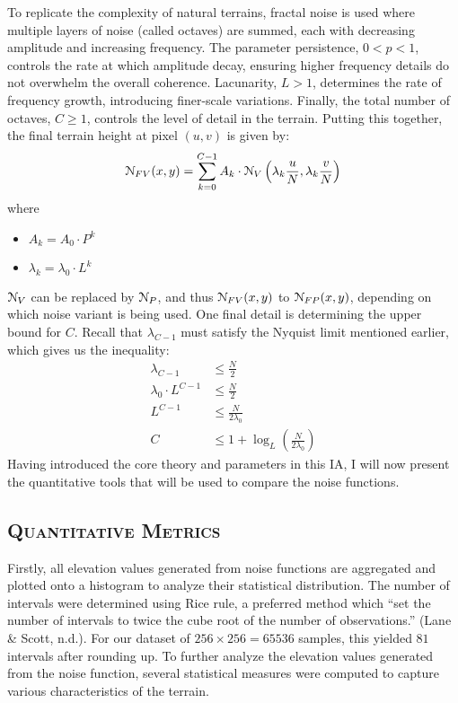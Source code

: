 To replicate the complexity of natural terrains, fractal noise is used where multiple layers of noise (called octaves) are summed, each with 
decreasing amplitude and increasing frequency. The parameter persistence, $0<p<1$, controls the rate at which amplitude decay, ensuring higher 
frequency details do not overwhelm the overall coherence. Lacunarity, $L>1$, determines the rate of frequency growth, introducing finer-scale 
variations. Finally, the total number of octaves, $C\ge 1$, controls the level of detail in the terrain. Putting this together, the final terrain 
height at pixel $(u,v)$ is given by:
\[\EuScript{N}_{FV}(x,y)=\sum_{k=0}^{C-1}A_k\cdot\EuScript{N}_V\left(\lambda_k\frac{u}{N},\lambda_k\frac{v}{N}\right)\]
where
\begin{itemize}
    \item $A_k=A_0\cdot P^k$
    \item $\lambda_k=\lambda_0\cdot L^k$
\end{itemize}
$\EuScript{N}_V$ can be replaced by $\EuScript{N}_P$, and thus $\EuScript{N}_{FV}(x,y)$ to $\EuScript{N}_{FP}(x,y)$, depending on which noise variant 
is being used. One final detail is determining the upper bound for $C$. Recall that $\lambda_{C-1}$ must satisfy the Nyquist limit mentioned earlier, 
which gives us the inequality:
\begin{align*}
    \lambda_{C-1}&\le \frac{N}{2}\\
    \lambda_0\cdot L^{C-1} &\le \frac{N}{2}\\
    L^{C-1} &\le \frac{N}{2\lambda_0}\\
    C &\le 1+\log_L\left(\frac{N}{2\lambda_0}\right)
\end{align*}
Having introduced the core theory and parameters in this IA, I will now present the quantitative tools that will be used to compare the noise functions.

\subsection{\textsc{Quantitative Metrics}} \label{quant_metrics}
\vspace*{-10pt}

Firstly, all elevation values generated from noise functions are aggregated and plotted onto a histogram to analyze their statistical distribution. The 
number of intervals were determined using Rice rule, a preferred method which “set the number of intervals to twice the cube root of the number of 
observations.” (Lane \& Scott, n.d.). For our dataset of $256\times256=65536$ samples, this yielded $81$ intervals after rounding up. To further analyze 
the elevation values generated from the noise function, several statistical measures were computed to capture various characteristics of the terrain.

